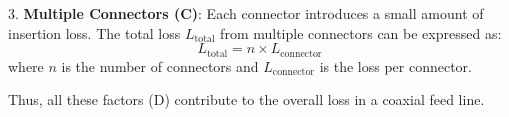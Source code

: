 3. \textbf{Multiple Connectors (C)}: Each connector introduces a small amount of insertion loss. The total loss \( L_{\text{total}} \) from multiple connectors can be expressed as:
   \[
   L_{\text{total}} = n \times L_{\text{connector}}
   \]
   where \( n \) is the number of connectors and \( L_{\text{connector}} \) is the loss per connector.

Thus, all these factors (D) contribute to the overall loss in a coaxial feed line.

